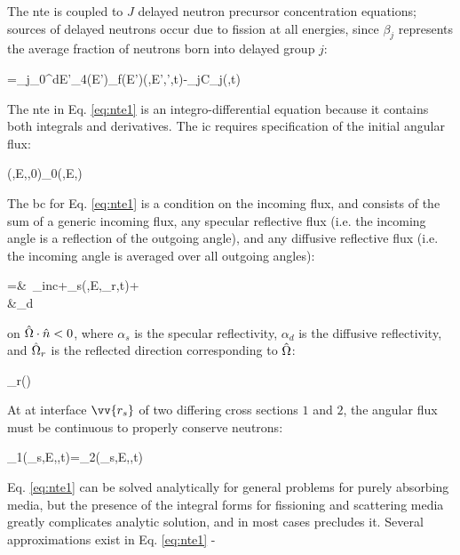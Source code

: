 The \gls{nte} is coupled to \(J\) delayed neutron precursor concentration equations; sources of delayed neutrons occur due to fission at all energies, since \(\beta_j\) represents the average fraction of neutrons born into delayed group \(j\):

\beq
\label{eq:DelayedNeutrons}
=\beta_j\int_{0}^\infty dE'\int_{4\pi}\nu(E')\Sigma_f(E')\psi(,E',\hO',t)-\lambda_jC_j(,t)\hspace{1cm}
\eeq

The \gls{nte} in Eq. \eqref{eq:nte1} is an integro-differential equation because it contains both integrals and derivatives. The \gls{ic} requires specification of the initial angular flux:

\beq
\psi(,E,\hO,0)\equiv\psi_0(,E,\hO)
\eeq

The \gls{bc} for Eq. \eqref{eq:nte1} is a condition on the incoming flux, and consists of the sum of a generic incoming flux, any specular reflective flux (i.e. the incoming angle is a reflection of the outgoing angle), and any diffusive reflective flux (i.e. the incoming angle is averaged over all outgoing angles):

\beqa
\label{eq:NTEBCs}
\psi\seat=&\ \psi_{inc}\seat+\alpha_s\seat\psi(,E,\hO_r,t)+\\
&\hspace{1cm}\alpha_d\seat{}
\eeqa

on \(\hat{\Omega}\cdot\hat{n}<0\), where \(\alpha_s\) is the specular reflectivity, \(\alpha_d\) is the diffusive reflectivity, and \(\hat{\Omega}_r\) is the reflected direction corresponding to \(\hat{\Omega}\):

\beq
\label{eq:hOrDef}
\hO_r\equiv{}\left(\hO\cdot{}\right)
\eeq

At at interface \(\vv{r_s}\) of two differing cross sections \(1\) and \(2\), the angular flux must be continuous to properly conserve neutrons:

\beq
\label{eq:NTE_interface}
\psi_1(_s,E,\hO,t)=\psi_2(_s,E,\hO,t)
\eeq

Eq. \eqref{eq:nte1} can be solved analytically for general problems for purely absorbing media, but the presence of the integral forms for fissioning and scattering media greatly complicates analytic solution, and in most cases precludes it. Several approximations exist in Eq. \eqref{eq:nte1} -

